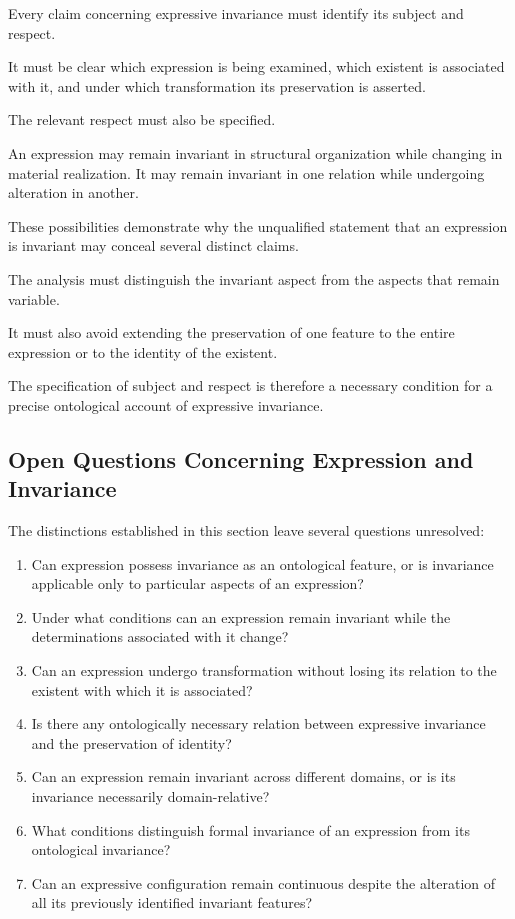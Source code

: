 Every claim concerning expressive invariance
must identify its subject and respect.

It must be clear which expression is being examined,
which existent is associated with it, and under
which transformation its preservation is asserted.

The relevant respect must also be specified.

An expression may remain invariant in structural
organization while changing in material realization.
It may remain invariant in one relation while
undergoing alteration in another.

These possibilities demonstrate why the unqualified
statement that an expression is invariant may
conceal several distinct claims.

The analysis must distinguish the invariant aspect
from the aspects that remain variable.

It must also avoid extending the preservation
of one feature to the entire expression or
to the identity of the existent.

The specification of subject and respect is
therefore a necessary condition for a precise
ontological account of expressive invariance.

\subsection{Open Questions Concerning Expression and Invariance}

The distinctions established in this section
leave several questions unresolved:

\begin{enumerate}
    \item Can expression possess invariance as
    an ontological feature, or is invariance
    applicable only to particular aspects of
    an expression?

    \item Under what conditions can an expression
    remain invariant while the determinations
    associated with it change?

    \item Can an expression undergo transformation
    without losing its relation to the existent
    with which it is associated?

    \item Is there any ontologically necessary
    relation between expressive invariance
    and the preservation of identity?

    \item Can an expression remain invariant
    across different domains, or is its invariance
    necessarily domain-relative?

    \item What conditions distinguish formal
    invariance of an expression from its
    ontological invariance?

    \item Can an expressive configuration remain
    continuous despite the alteration of all
    its previously identified invariant features?
\end{enumerate}

